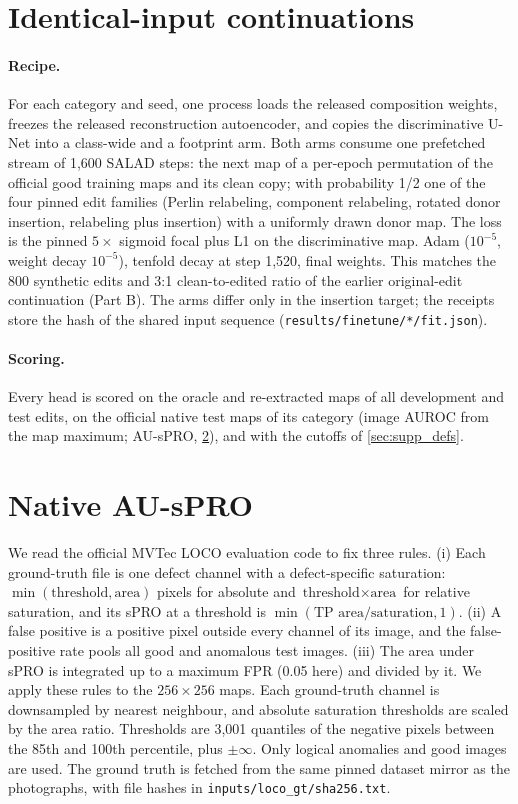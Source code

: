 \section{Identical-input continuations}
\label{sec:supp_ft}
\paragraph{Recipe.} For each category and seed, one process loads the released composition weights, freezes the released reconstruction autoencoder, and copies the discriminative U-Net into a class-wide and a footprint arm. Both arms consume one prefetched stream of 1{,}600 SALAD steps: the next map of a per-epoch permutation of the official good training maps and its clean copy; with probability 1/2 one of the four pinned edit families (Perlin relabeling, component relabeling, rotated donor insertion, relabeling plus insertion) with a uniformly drawn donor map. The loss is the pinned $5\times$ sigmoid focal plus L1 on the discriminative map. Adam ($10^{-5}$, weight decay $10^{-5}$), tenfold decay at step 1{,}520, final weights. This matches the 800 synthetic edits and 3:1 clean-to-edited ratio of the earlier original-edit continuation (Part B). The arms differ only in the insertion target; the receipts store the hash of the shared input sequence (\texttt{results/finetune/*/fit.json}).
\paragraph{Scoring.} Every head is scored on the oracle and re-extracted maps of all development and test edits, on the official native test maps of its category (image AUROC from the map maximum; AU-sPRO, \cref{sec:supp_native}), and with the cutoffs of \cref{sec:supp_defs}.

\section{Native AU-sPRO}
\label{sec:supp_native}
We read the official MVTec LOCO evaluation code to fix three rules. (i) Each ground-truth file is one defect channel with a defect-specific saturation: $\min(\text{threshold}, \text{area})$ pixels for absolute and $\text{threshold}\times\text{area}$ for relative saturation, and its sPRO at a threshold is $\min(\text{TP area}/\text{saturation}, 1)$. (ii) A false positive is a positive pixel outside every channel of its image, and the false-positive rate pools all good and anomalous test images. (iii) The area under sPRO is integrated up to a maximum FPR (0.05 here) and divided by it. We apply these rules to the $256{\times}256$ maps. Each ground-truth channel is downsampled by nearest neighbour, and absolute saturation thresholds are scaled by the area ratio. Thresholds are 3{,}001 quantiles of the negative pixels between the 85th and 100th percentile, plus $\pm\infty$. Only logical anomalies and good images are used. The ground truth is fetched from the same pinned dataset mirror as the photographs, with file hashes in \texttt{inputs/loco\_gt/sha256.txt}.

